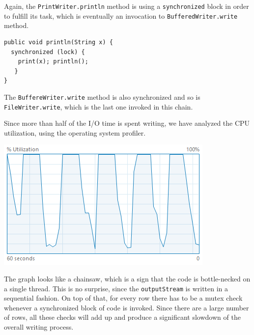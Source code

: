 \documentclass[a4paper,twoside]{article}
\begin{document}
Again, the {\texttt{PrintWriter.println}} method is using a {\texttt{synchronized}} block in order to fulfill its task, which is eventually an invocation to {\texttt{BufferedWriter.write}} method.
\begin{verbatim}
public void println(String x) {
  synchronized (lock) {
    print(x); println();
   }
}
\end{verbatim}
The {\texttt{BuffereWriter.write}} method is also synchronized and so is {\texttt{FileWriter.write}}, which is the last one invoked in this chain.

Since more than half of the I/O time is spent writing, we have analyzed the CPU utilization, using the operating system profiler.
\begin{center}
\includegraphics[scale=0.5]{images/cpu_original.png}
\end{center}
The graph looks like a chainsaw, which is a sign that the code is bottle-necked on a single thread.
This is no surprise, since the {\texttt{outputStream}} is written in a sequential fashion.
On top of that, for every row there has to be a mutex check whenever a synchronized block of code is invoked.
Since there are a large number of rows, all these checks will add up and produce a significant slowdown of the overall writing process.
\end{document}
